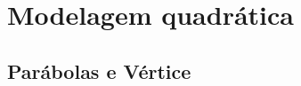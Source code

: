 \documentclass[pdftex, brazil, 12pt, twoside]{article}
\begin{document}
\section{Modelagem quadrática}
\label{modelagem-quadratica}

\subsection{Parábolas e Vértice}
\label{modelagem-quadratica-parabolas}





\end{document}

